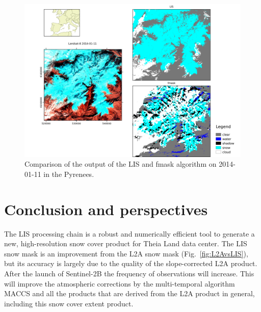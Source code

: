 \documentclass[a4paper]{article}
\begin{document}
\begin{figure}[h]
 \centering
 \includegraphics[width=\textwidth]{./images/fmask20140111.png}
 \caption{Comparison of the output of the LIS and fmask algorithm on 2014-01-11 in the Pyrenees.}
 \label{fig:fmask}
\end{figure}


\clearpage

\section{Conclusion and perspectives}\label{par:conclu}

The LIS processing chain is a robust and numerically efficient tool to generate a new, high-resolution snow cover product for Theia Land data center. The LIS snow mask is an improvement from the L2A snow mask (Fig.~\ref{fig:L2AvsLIS}), but its accuracy is largely due to the quality of the slope-corrected L2A product. After the launch of Sentinel-2B the frequency of observations will increase. This will improve the atmospheric corrections by the multi-temporal algorithm MACCS and all the products that are derived from the L2A product in general, including this snow cover extent product. 
\end{document}
